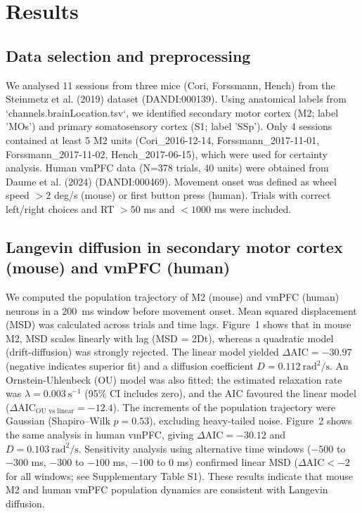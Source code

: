 \documentclass[10pt,onecolumn]{article}
\begin{document}
\section{Results}

\subsection{Data selection and preprocessing}
We analysed 11 sessions from three mice (Cori, Forssmann, Hench) from the Steinmetz et al. (2019) dataset (DANDI:000139). Using anatomical labels from `channels.brainLocation.tsv`, we identified secondary motor cortex (M2; label 'MOs') and primary somatosensory cortex (S1; label 'SSp'). Only 4 sessions contained at least 5 M2 units (Cori\_2016-12-14, Forssmann\_2017-11-01, Forssmann\_2017-11-02, Hench\_2017-06-15), which were used for certainty analysis. Human vmPFC data (N=378 trials, 40 units) were obtained from Daume et al. (2024) (DANDI:000469). Movement onset was defined as wheel speed \(>2\) deg/s (mouse) or first button press (human). Trials with correct left/right choices and RT \(>50\) ms and \(<1000\) ms were included.

\subsection{Langevin diffusion in secondary motor cortex (mouse) and vmPFC (human)}
We computed the population trajectory of M2 (mouse) and vmPFC (human) neurons in a 200~ms window before movement onset. Mean squared displacement (MSD) was calculated across trials and time lags. Figure~1 shows that in mouse M2, MSD scales linearly with lag (MSD = 2Dt), whereas a quadratic model (drift-diffusion) was strongly rejected. The linear model yielded \(\Delta \mathrm{AIC} = -30.97\) (negative indicates superior fit) and a diffusion coefficient \(D = 0.112\ \text{rad}^2/\text{s}\). An Ornstein-Uhlenbeck (OU) model was also fitted; the estimated relaxation rate was \(\lambda = 0.003\ \text{s}^{-1}\) (95\% CI includes zero), and the AIC favoured the linear model (\(\Delta \mathrm{AIC}_{\text{OU vs linear}} = -12.4\)). The increments of the population trajectory were Gaussian (Shapiro–Wilk \(p = 0.53\)), excluding heavy-tailed noise. Figure~2 shows the same analysis in human vmPFC, giving \(\Delta \mathrm{AIC} = -30.12\) and \(D = 0.103\ \text{rad}^2/\text{s}\). Sensitivity analysis using alternative time windows (\(-500\) to \(-300\) ms, \(-300\) to \(-100\) ms, \(-100\) to \(0\) ms) confirmed linear MSD (\(\Delta \mathrm{AIC} < -2\) for all windows; see Supplementary Table S1). These results indicate that mouse M2 and human vmPFC population dynamics are consistent with Langevin diffusion.
\end{document}
